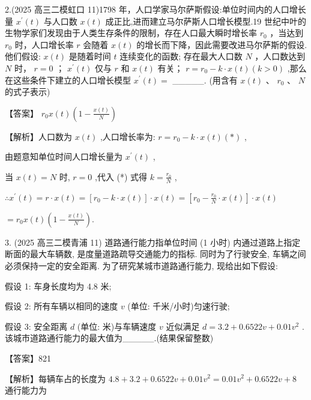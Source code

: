 \documentclass[10pt]{article}
\newcommand*\circled[1]{\tikz[baseline=(char.base)]{\node[shape=circle,draw,inner sep=1.5pt] (char) {\small #1};}}
\begin{document}
2.(2025 高三二模虹口 11)1798 年，人口学家马尔萨斯假设:单位时间内的人口增长量 \({x}^{\prime }\left( t\right)\) 与人口数 \(x\left( t\right)\) 成正比,进而建立马尔萨斯人口增长模型.19 世纪中叶的生物学家们发现由于人类生存条件的限制，存在人口最大瞬时增长率 \({r}_{0}\) ，当达到 \({r}_{0}\) 时，人口增长率 \(r\) 会随着 \(x\left( t\right)\) 的增长而下降，因此需要改进马尔萨斯的假设. 他们假设: \circled{1}  \(x\left( t\right)\) 是随着时间 \(t\) 连续变化的函数;  \circled{2} 存在最大人口数 \(N\) ，人口数达到 \(N\) 时， \(r = 0\) ； \circled{3}  \({x}^{\prime }\left( t\right)\) 仅与 \(r\) 和 \(x\left( t\right)\) 有关； \circled{4}  \(r = {r}_{0} - k \cdot  x\left( t\right) \left( {k > 0}\right)\) ,那么在这些条件下建立的人口增长模型 \({x}^{\prime }\left( t\right)  =\) \_\_\_\_\_. (用含有 \(x\left( t\right) \text{ 、 }{r}_{0}\text{ 、 }N\) 的式子表示)

【答案】 \({r}_{0}x\left( t\right) \left( {1 - \frac{x\left( t\right) }{N}}\right)\)

【解析】人口数为 \(x\left( t\right)\) ,人口增长率为: \(r = {r}_{0} - k \cdot  x\left( t\right) \left( *\right)\) ,

由题意知单位时间人口增长量为 \({x}^{\prime }\left( t\right)\) ,

当 \(x\left( t\right)  = N\) 时, \(r = 0\) ,代入 (*) 式得 \(k = \frac{{r}_{0}}{N}\) ,

\(\therefore {x}^{\prime }\left( t\right)  = r \cdot  x\left( t\right)  = \left\lbrack  {{r}_{0} - k \cdot  x\left( t\right) }\right\rbrack   \cdot  x\left( t\right)  = \left\lbrack  {{r}_{0} - \frac{{r}_{0}}{N} \cdot  x\left( t\right) }\right\rbrack   \cdot  x\left( t\right)\)

\(= {r}_{0}x\left( t\right) \left( {1 - \frac{x\left( t\right) }{N}}\right) .\)

3. (2025 高三二模青浦 11) 道路通行能力指单位时间 (1 小时) 内通过道路上指定断面的最大车辆数, 是度量道路疏导交通能力的指标. 同时为了行驶安全, 车辆之间必须保持一定的安全距离. 为了研究某城市道路通行能力, 现给出如下假设:

假设 1: 车身长度均为 4.8 米;

假设 2: 所有车辆以相同的速度 \(v\) (单位: 千米/小时)匀速行驶;

假设 3: 安全距离 \(d\) (单位: 米)与车辆速度 \(v\) 近似满足 \(d = {3.2} + {0.6522v} + {0.01}{v}^{2}\) . 该城市道路通行能力的最大值为\_\_\_\_\_.(结果保留整数)

【答案】821

【解析】每辆车占的长度为 \({4.8} + {3.2} + {0.6522v} + {0.01}{v}^{2} = {0.01}{v}^{2} + {0.6522v} + 8\) 通行能力为
\end{document}

